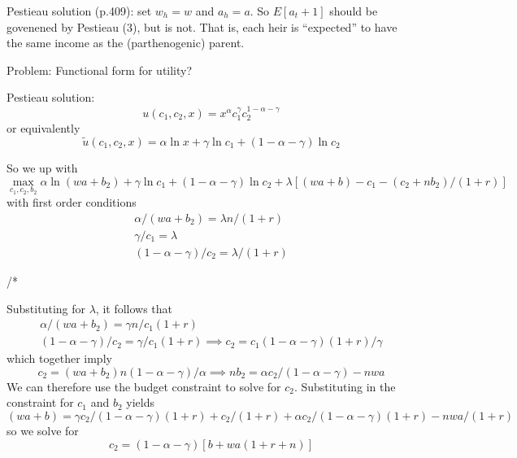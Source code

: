 \documentclass{article}
\begin{document}
Pestieau solution (p.409): set $w_{h}=w$ and $a_{h}=a$.
So $E[a_t+1]$ should be govenened by Pestieau (3), but is not.
That is, each heir is ``expected'' to have the same income as the (parthenogenic) parent.

Problem: Functional form for utility?

Pestieau solution:
\begin{equation}\label{utility_fn}
u(c_{1}, c_{2}, x) = x^{\alpha} c_{1}^{\gamma} c_{2}^{1-\alpha-\gamma}
\end{equation}
or equivalently
\begin{equation}\label{ln_utility_fn}
\tilde{u}(c_{1}, c_{2}, x) = \alpha \ln x +\gamma \ln c_{1} + (1-\alpha-\gamma) \ln c_{2}
\end{equation}


So we up with
\begin{equation}
\max_{c_{1}, c_{2}, b_{2}}
\alpha \ln (wa+ b_{2})
+ \gamma \ln c_{1}
+ (1-\alpha-\gamma) \ln c_{2}
+ \lambda [ (w a + b) - c_{1} - (c_{2} + n b_{2})/(1+r)]
\end{equation}
with first order conditions
\begin{gather}
\alpha/(wa+b_{2}) = \lambda n/(1+r)\label{dL/db2}
\\
\gamma/c_{1} = \lambda \label{dL/dc1}
\\
(1-\alpha-\gamma)/ c_{2} = \lambda / (1+r) \label{dL/dc2}
\end{gather}


/*

Substituting for $\lambda$, it follows that
\begin{gather}
\alpha/(wa+b_{2}) = \gamma n/ c_{1} (1+r)
\\
(1-\alpha-\gamma)/ c_{2} = \gamma / c_{1} (1+r)  \implies  c_{2} = c_{1} (1-\alpha-\gamma)(1+r)/\gamma
\end{gather}
which together imply
\begin{equation}
c_{2} = (wa+b_{2})n(1-\alpha-\gamma)/\alpha \implies n b_{2} = \alpha c_{2} /(1-\alpha-\gamma)  - nwa
\end{equation}
We can therefore use the budget constraint to solve for $c_{2}$.
Substituting in the constraint for $c_{1}$ and $b_{2}$ yields
\begin{equation}
(w a + b) = \gamma c_{2}/(1-\alpha-\gamma)(1+r) + c_{2}/(1+r) + \alpha c_{2}/(1-\alpha-\gamma)(1+r) - nwa/(1+r)
\end{equation}
so we solve for
\begin{equation}
c_{2} = (1-\alpha-\gamma)[b + wa(1+r+n)]
\end{equation}
\end{document}
